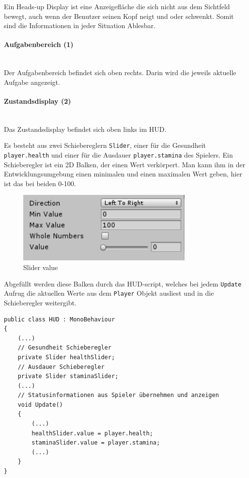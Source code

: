 Ein Heads-up Display ist eine Anzeigefläche die sich nicht aus dem Sichtfeld bewegt, auch wenn der Benutzer seinen Kopf neigt und oder schwenkt.
Somit sind die Informationen in jeder Situation Ablesbar.
 
\paragraph{Aufgabenbereich (1)}\mbox{} \\
Der Aufgabenbereich befindet sich oben rechts.
Darin wird die jeweils aktuelle Aufgabe angezeigt.

\paragraph{Zustandsdisplay (2)}\mbox{} \\
Das Zustandsdisplay befindet sich oben links im HUD.

Es besteht aus zwei Schiebereglern \lstinline{Slider}, einer für die Gesundheit \lstinline{player.health} und einer für die Ausdauer \lstinline{player.stamina} des Spielers.
Ein Schieberegler ist ein 2D Balken, der einen Wert verkörpert. Man kann ihm in der Entwicklungsumgebung einen minimalen und einen maximalen Wert geben, hier ist das bei beiden 0-100.

\begin{figure}[H]
\includegraphics[scale=1]{screenshots/nullhundert.png}
\caption{Slider value}
\end{figure}

Abgefüllt werden diese Balken durch das HUD-script, welches bei jedem \lstinline{Update} Aufrug die aktuellen Werte aus dem \lstinline{Player} Objekt ausliest und in die Schieberegler weitergibt.

\begin{lstlisting}[caption={Schieberegler erstellen}]
public class HUD : MonoBehaviour
{
	(...)
	// Gesundheit Schieberegler
	private Slider healthSlider;
	// Ausdauer Schieberegler
	private Slider staminaSlider;
	(...)
	// Statusinformationen aus Spieler übernehmen und anzeigen
	void Update()
	{
		(...)
		healthSlider.value = player.health;
		staminaSlider.value = player.stamina;
		(...)
	}
}
\end{lstlisting}

